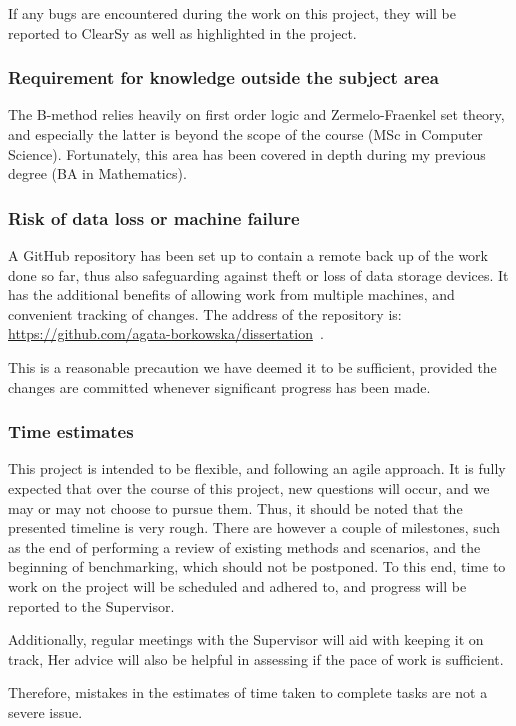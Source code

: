 \documentclass[11pt,journal]{IEEEtran}
\begin{document}
	If any bugs are encountered during the work on this project, they will be reported to ClearSy as well as highlighted in the project. 
	
	\subsubsection{Requirement for knowledge outside the subject area}
	The B-method relies heavily on first order logic and Zermelo-Fraenkel set theory, and especially the latter is beyond the scope of the course (MSc in Computer Science). Fortunately, this area has been covered in depth during my previous degree (BA in Mathematics).
	
	\subsubsection{Risk of data loss or machine failure}
	A GitHub repository has been set up to contain a remote back up of the work done so far, thus also safeguarding against theft or loss of data storage devices. It has the additional benefits of allowing work from multiple machines, and convenient tracking of changes. The address of the repository is: \url{https://github.com/agata-borkowska/dissertation}~.
	
	This is a reasonable precaution we have deemed it to be sufficient, provided the changes are committed whenever significant progress has been made.
	
	\subsubsection{Time estimates}
	This project is intended to be flexible, and following an agile approach. It is fully expected that over the course of this project, new questions will occur, and we may or may not choose to pursue them. Thus, it should be noted that the presented timeline is very rough. There are however a couple of milestones, such as the end of performing a review of existing methods and scenarios, and the beginning of benchmarking, which should not be postponed. To this end, time to work on the project will be scheduled and adhered to, and progress will be reported to the Supervisor.
	
	Additionally, regular meetings with the Supervisor will aid with keeping it on track, Her advice will also be helpful in assessing if the pace of work is sufficient.
	
	Therefore, mistakes in the estimates of time taken to complete tasks are not a severe issue.
	
\end{document}
